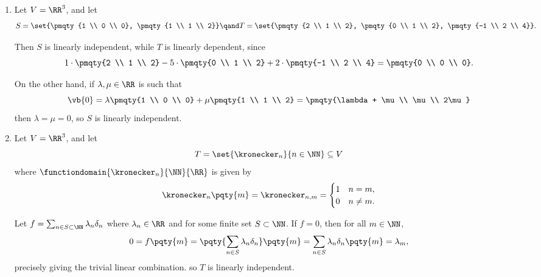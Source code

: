 \begin{examples}
    \begin{enumerate}[label=(\roman*)]
        \item Let \(V = \RR^3\), and let
        \[
            S = \set{\pmqty{1 \\ 0 \\ 0}, \pmqty{1 \\ 1 \\ 2}} \qand T = \set{\pmqty{2 \\ 1 \\ 2}, \pmqty{0 \\ 1 \\ 2}, \pmqty{-1 \\ 2 \\ 4}}.
        \]

        Then \(S\) is linearly independent, while \(T\) is linearly dependent, since
        \[
            1 \cdot \pmqty{2 \\ 1 \\ 2} - 5 \cdot \pmqty{0 \\ 1 \\ 2} + 2 \cdot \pmqty{-1 \\ 2 \\ 4} = \pmqty{0 \\ 0 \\ 0}.
        \]

        On the other hand, if \(\lambda, \mu \in \RR\) is such that
        \[
            \vb{0} = \lambda \pmqty{1 \\ 0 \\ 0} + \mu \pmqty{1 \\ 1 \\ 2} = \pmqty{\lambda + \mu \\ \mu \\ 2\mu}
        \]
        then \(\lambda = \mu = 0\), so \(S\) is linearly independent.

        \item Let \(V = \RR^3\), and let
        \[
            T = \set{\kronecker_n}{n \in \NN} \subseteq V
        \]
        where \(\functiondomain{\kronecker_n}{\NN}{\RR}\) is given by
        \[
            \kronecker_n\pqty{m} = \kronecker_{n, m} = \begin{cases}
                1 & n = m, \\
                0 & n \neq m.
            \end{cases}
        \]

        Let \(f = \sum_{n \in S \subset \NN}\lambda_n \delta_n\) where \(\lambda_n \in \RR\) and for some  finite set \(S \subset \NN\). If \(f = 0\), then for all \(m \in \NN\),
        \[
            0 = f\pqty{m} = \pqty{{\sum_{n \in S} \lambda_n \delta_n}} \pqty{m} = \sum_{n \in S} \lambda_n \delta_n\pqty{m} = \lambda_m,
        \]
        precisely giving the trivial linear combination. so \(T\) is linearly independent.
    \end{enumerate}
\end{examples}


